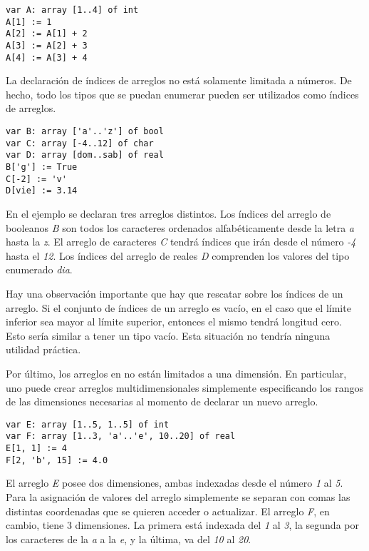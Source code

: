 \documentclass{article}
\begin{document}
\begin{lstlisting}
var A: array [1..4] of int
A[1] := 1 
A[2] := A[1] + 2
A[3] := A[2] + 3
A[4] := A[3] + 4
\end{lstlisting}

La declaración de índices de arreglos no está solamente limitada a números.
De hecho, todo los tipos que se puedan enumerar pueden ser utilizados como índices de arreglos.

\begin{lstlisting}
var B: array ['a'..'z'] of bool
var C: array [-4..12] of char
var D: array [dom..sab] of real
B['g'] := True
C[-2] := 'v'
D[vie] := 3.14
\end{lstlisting}

En el ejemplo se declaran tres arreglos distintos.
Los índices del arreglo de booleanos \textit{B} son todos los caracteres ordenados alfabéticamente desde la letra \textit{a} hasta la \textit{z}.
El arreglo de caracteres  \textit{C} tendrá índices que irán desde el número \textit{-4} hasta el \textit{12}.
Los índices del arreglo de reales \textit{D} comprenden los valores del tipo enumerado \textit{dia}.

Hay una observación importante que hay que rescatar sobre los índices de un arreglo.
Si el conjunto de índices de un arreglo es vacío, en el caso que el límite inferior sea mayor al límite superior, entonces el mismo tendrá longitud cero.
Esto sería similar a tener un tipo vacío.
Esta situación no tendría ninguna utilidad práctica.

Por último, los arreglos en \Lang\space no están limitados a una dimensión.
En particular, uno puede crear arreglos multidimensionales simplemente especificando los rangos de las dimensiones necesarias al momento de declarar un nuevo arreglo.

\begin{lstlisting}
var E: array [1..5, 1..5] of int
var F: array [1..3, 'a'..'e', 10..20] of real
E[1, 1] := 4
F[2, 'b', 15] := 4.0
\end{lstlisting}

El arreglo \textit{E} posee dos dimensiones, ambas indexadas desde el número \textit{1} al \textit{5}.
Para la asignación de valores del arreglo simplemente se separan con comas las distintas coordenadas que se quieren acceder o actualizar.
El arreglo \textit{F}, en cambio, tiene 3 dimensiones.
La primera está indexada del \textit{1} al \textit{3}, la segunda por los caracteres de la \textit{a} a la \textit{e}, y la última, va del \textit{10} al \textit{20}.
\end{document}
